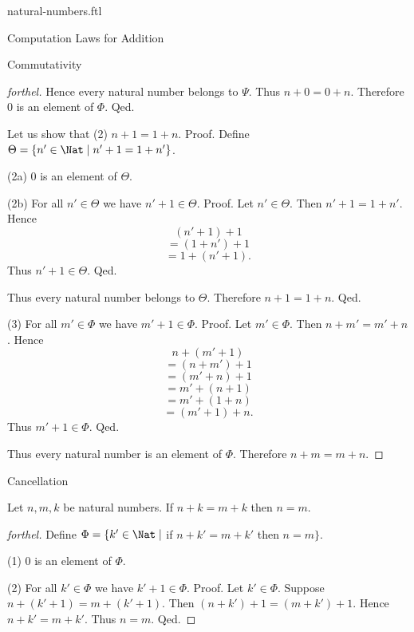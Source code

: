 \documentclass{naproche-library}
\begin{document}
\begin{smodule}[title=Natural Numbers]{natural-numbers.ftl}
\begin{sfragment}{Computation Laws for Addition}
\begin{sfragment}{Commutativity}
\begin{proof}[forthel]
        Hence every natural number belongs to $\Psi$.
        Thus $n + 0 = 0 + n$.
        Therefore $0$ is an element of $\Phi$.
      Qed.

      Let us show that (2) $n + 1 = 1 + n$. \newline
      Proof.
        Define $\Theta = \{ n' \in \Nat \mid n' + 1 = 1 + n' \}$.

        (2a) $0$ is an element of $\Theta$.

        (2b) For all $n' \in \Theta$ we have $n' + 1 \in \Theta$. \newline
        Proof.
          Let $n' \in \Theta$.
          Then $n' + 1 = 1 + n'$.
          Hence
          \[  (n' + 1) + 1        \]
          \[    = (1 + n') + 1    \]
          \[    = 1 + (n' + 1).   \]
          Thus $n' + 1 \in \Theta$.
        Qed.

        Thus every natural number belongs to $\Theta$.
        Therefore $n + 1 = 1 + n$.
      Qed.

      (3) For all $m' \in \Phi$ we have $m' + 1 \in \Phi$. \newline
      Proof.
        Let $m' \in \Phi$.
        Then $n + m' = m' + n$.
        Hence
        \[  n + (m'  + 1)       \]
        \[    = (n + m') + 1    \]
        \[    = (m' + n) + 1    \]
        \[    = m' + (n + 1)    \]
        \[    = m' + (1 + n)    \]
        \[    = (m' + 1) + n.   \]
        Thus $m' + 1 \in \Phi$.
      Qed.

      Thus every natural number is an element of $\Phi$.
      Therefore $n + m = m + n$.
    \end{proof}
  \end{sfragment}

  \begin{sfragment}{Cancellation}
    \begin{proposition}[forthel,id=ARITHMETIC_03_3137702874578944]
      Let $n, m, k$ be natural numbers.
      If $n + k = m + k$ then $n = m$.
    \end{proposition}
    \begin{proof}[forthel]
      Define $\Phi = \{ k' \in \Nat \mid$ if $n + k' = m + k'$ then $n = m \}$.

      (1) $0$ is an element of $\Phi$.

      (2) For all $k' \in \Phi$ we have $k' + 1 \in \Phi$. \newline
      Proof.
        Let $k' \in \Phi$.
        Suppose $n + (k' + 1) = m + (k' + 1)$.
        Then $(n + k') + 1 = (m + k') + 1$.
        Hence $n + k' = m + k'$.
        Thus $n = m$.
      Qed.


\end{proof}
\end{sfragment}
\end{sfragment}
\end{smodule}
\end{document}
